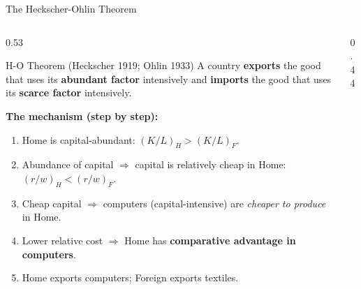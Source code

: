 \documentclass[aspectratio=169]{beamer}
\begin{document}
\begin{frame}[shrink=13]{The Heckscher-Ohlin Theorem}
\begin{columns}[T]
\begin{column}{0.53\textwidth}
\begin{block}{H-O Theorem (Heckscher 1919; Ohlin 1933)}
A country \textbf{exports} the good that uses its
\textbf{abundant factor} intensively and \textbf{imports}
the good that uses its \textbf{scarce factor} intensively.
\end{block}
\vspace{0.4em}
\textbf{The mechanism (step by step):}
\begin{enumerate}\small
  \item Home is capital-abundant: $(K/L)_H > (K/L)_F$.
  \item Abundance of capital $\Rightarrow$ capital is
        relatively cheap in Home: $(r/w)_H < (r/w)_F$.
  \item Cheap capital $\Rightarrow$ computers
        (capital-intensive) are \emph{cheaper to produce}
        in Home.
  \item Lower relative cost $\Rightarrow$ Home has
        \textbf{comparative advantage in computers}.
  \item Home exports computers; Foreign exports textiles.
\end{enumerate}
\end{column}
\begin{column}{0.44\textwidth}

\end{column}
\end{columns}
\end{frame}
\end{document}
